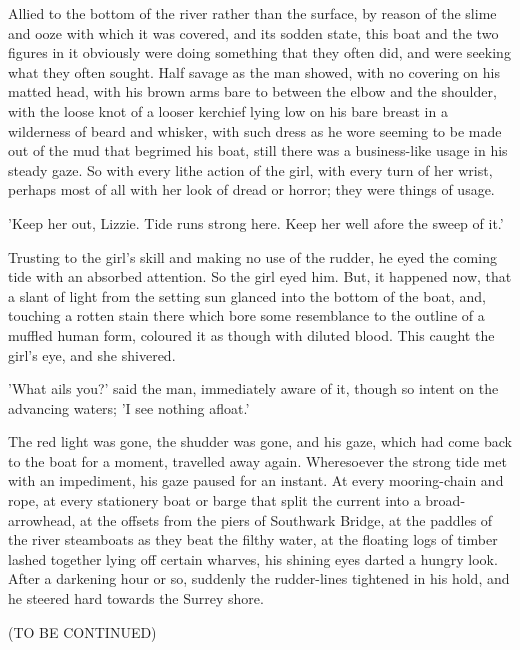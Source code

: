 \documentclass[12pt]{book}
\begin{document}
Allied to the bottom of the river rather than the surface, by reason
of the slime and ooze with which it was covered, and its sodden
state, this boat and the two figures in it obviously were doing
something that they often did, and were seeking what they often
sought. Half savage as the man showed, with no covering on his
matted head, with his brown arms bare to between the elbow and
the shoulder, with the loose knot of a looser kerchief lying low on
his bare breast in a wilderness of beard and whisker, with such
dress as he wore seeming to be made out of the mud that begrimed
his boat, still there was a business-like usage in his steady gaze.
So with every lithe action of the girl, with every turn of her wrist,
perhaps most of all with her look of dread or horror; they were
things of usage.

'Keep her out, Lizzie. Tide runs strong here. Keep her well afore
the sweep of it.'

Trusting to the girl's skill and making no use of the rudder, he eyed
the coming tide with an absorbed attention. So the girl eyed him.
But, it happened now, that a slant of light from the setting sun
glanced into the bottom of the boat, and, touching a rotten stain
there which bore some resemblance to the outline of a muffled
human form, coloured it as though with diluted blood. This caught
the girl's eye, and she shivered.

'What ails you?' said the man, immediately aware of it, though so
intent on the advancing waters; 'I see nothing afloat.'

The red light was gone, the shudder was gone, and his gaze, which
had come back to the boat for a moment, travelled away again.
Wheresoever the strong tide met with an impediment, his gaze
paused for an instant. At every mooring-chain and rope, at every
stationery boat or barge that split the current into a broad-
arrowhead, at the offsets from the piers of Southwark Bridge, at the
paddles of the river steamboats as they beat the filthy water, at the
floating logs of timber lashed together lying off certain wharves,
his shining eyes darted a hungry look. After a darkening hour or
so, suddenly the rudder-lines tightened in his hold, and he steered
hard towards the Surrey shore.





(TO BE CONTINUED)

\end{document}
